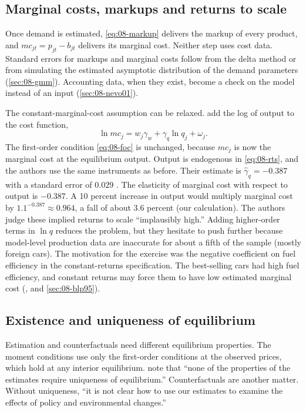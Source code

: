 \subsection{Marginal costs, markups and returns to scale}\label{sec:08-supply-mc}

Once demand is estimated, \eqref{eq:08-markup} delivers the markup of every product, and $mc_{jt} = p_{jt} - b_{jt}$
delivers its marginal cost. Neither step uses cost data. Standard errors for markups and marginal costs follow from the
delta method or from simulating the estimated asymptotic distribution of the demand parameters
(\cref{sec:08-gmm}). Accounting data, when they exist, become a check on the model instead of an input
(\cref{sec:08-nevo01}).

The constant-marginal-cost assumption can be relaxed. \citet[p.~877]{BerryLevinsohnPakes1995} add the log of output
to the cost function,
\begin{equation}\label{eq:08-rts}
  \ln mc_j = w_j\gamma_w + \gamma_q\ln q_j + \omega_j .
\end{equation}
The first-order condition \eqref{eq:08-foc} is unchanged, because $mc_j$ is now the marginal cost at the equilibrium
output. Output is endogenous in \eqref{eq:08-rts}, and the authors use the same instruments as before. Their estimate
is $\hat\gamma_q = -0.387$ with a standard error of $0.029$ \citep[Table~IV]{BerryLevinsohnPakes1995}. The elasticity
of marginal cost with respect to output is $-0.387$. A 10 percent increase in output would multiply marginal cost by
$1.1^{-0.387} \approx 0.964$, a fall of about 3.6 percent (our calculation). The authors judge these implied returns to
scale ``implausibly high.'' Adding higher-order terms in $\ln q$ reduces the problem, but they hesitate to push further
because model-level production data are inaccurate for about a fifth of the sample (mostly foreign cars). The
motivation for the exercise was the negative coefficient on fuel efficiency in the constant-returns specification. The
best-selling cars had high fuel efficiency, and constant returns may force them to have low estimated marginal cost
(\citealp[pp.~876--877]{BerryLevinsohnPakes1995}, and \cref{sec:08-blp95}).

\subsection{Existence and uniqueness of equilibrium}\label{sec:08-supply-exist}

Estimation and counterfactuals need different equilibrium properties. The moment conditions use only the first-order
conditions at the observed prices, which hold at any interior equilibrium. \citet[fn.~12]{BerryLevinsohnPakes1995}
note that ``none of the properties of the estimates require uniqueness of equilibrium.'' Counterfactuals are another
matter. Without uniqueness, ``it is not clear how to use our estimates to examine the effects of policy and
environmental changes.''

